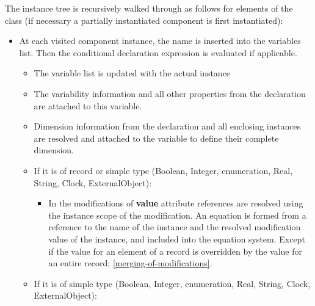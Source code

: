 The instance tree is recursively walked through as follows for elements
of the class (if necessary a partially instantiated component is first
instantiated):
\begin{itemize}
\item
  At each visited component instance, the name is inserted into the
  variables list. Then the conditional declaration expression is
  evaluated if applicable.

  \begin{itemize}
  \item
    The variable list is updated with the actual instance
  \item
    The variability information and all other properties from the
    declaration are attached to this variable.
  \item
    Dimension information from the declaration and all enclosing
    instances are resolved and attached to the variable to define their
    complete dimension.
  \item
    If it is of record or simple type (Boolean, Integer, enumeration,
    Real, String, Clock, ExternalObject):

    \begin{itemize}
    \item
      In the modifications of \textbf{value} attribute references are
      resolved using the instance scope of the modification. An equation
      is formed from a reference to the name of the instance and the
      resolved modification value of the instance, and included into the
      equation system. Except if the value for an element of a record is
      overridden by the value for an entire record; \autoref{merging-of-modifications}.
    \end{itemize}
  \item
    If it is of simple type (Boolean, Integer, enumeration, Real,
    String, Clock, ExternalObject):


\end{itemize}
\end{itemize}
